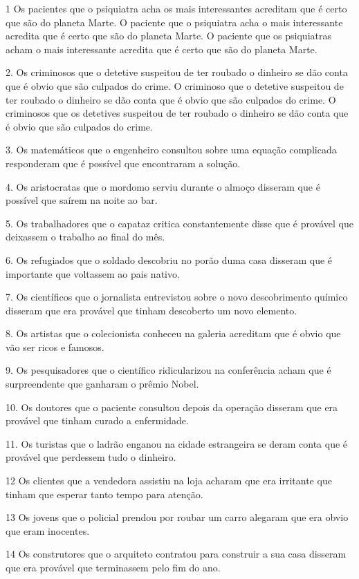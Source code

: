 1 
Os pacientes que o  psiquiatra  acha  os mais interessantes acreditam que é certo que são do planeta Marte.
O  paciente  que o  psiquiatra  acha  o  mais interessante  acredita  que é certo que são do planeta Marte.
O  paciente  que os psiquiatras acham o  mais interessante  acredita  que é certo que são do planeta Marte.

2. 
Os criminosos que o detetive suspeitou de ter roubado o dinheiro se dão conta que é obvio que são culpados do crime.
O criminoso que o detetive suspeitou de ter roubado o dinheiro se dão conta que é obvio que são culpados do crime.
O criminosos que os detetives suspeitou de ter roubado o dinheiro se dão conta que é obvio que são culpados do crime.

3. 
Os matemáticos que o engenheiro consultou sobre uma equação complicada responderam que é possível que encontraram a solução. 

4. 
Os aristocratas que o mordomo serviu durante o almoço disseram que é possível que saírem na noite ao bar.

5. 
Os trabalhadores que o capataz critica constantemente disse que é provável que deixassem o trabalho ao final do mês.

6. 
Os refugiados que o soldado descobriu no porão duma casa disseram que é importante que voltassem ao pais nativo.

7. 
Os científicos que o jornalista entrevistou sobre o novo descobrimento químico disseram que era provável que tinham descoberto um novo elemento.

8. 
Os artistas que o colecionista conheceu na galeria acreditam que é obvio que vão ser ricos e famosos.

9. 
Os pesquisadores que o científico ridicularizou na conferência acham que é surpreendente que ganharam o prêmio Nobel.

10.
Os doutores que o paciente consultou depois da operação disseram que era provável que tinham curado a enfermidade.

11.
Os turistas que o ladrão enganou na cidade estrangeira se deram conta que é provável que perdessem tudo o dinheiro. 

12
Os clientes que a vendedora assistiu na loja acharam que era irritante que tinham que esperar tanto tempo para atenção.

13
Os jovens que o policial prendou por roubar um carro alegaram que era obvio que eram inocentes.

14
Os construtores que o arquiteto contratou para construir a sua casa disseram que era provável que terminassem pelo fim do ano.

